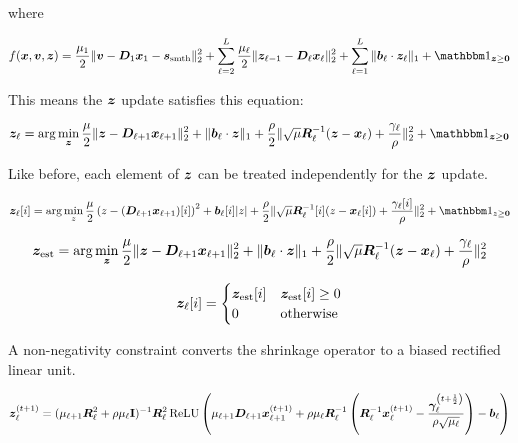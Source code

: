 where

\begin{equation}
f(\vx,\vv,\vz) = \frac{\mu_1}{2}\|\vv - \mD_1\vx_1  - \vs_{\text{smth}}\|_2^2 + \sum_{\ell = 2}^L \frac{\mu_{\ell}}{2}\|\vz_{\ell - 1} - \mD_{\ell}\vx_{\ell}\|_2^2 + \sum_{\ell = 1}^L \|\vb_{\ell} \cdot \vz_{\ell}\|_1 + \indicator_{\vz \geq \vzero}
\end{equation}

This means the $\bm{z}$ update satisfies this equation:

\begin{equation}
\vz_{\ell} = \arg\min_{\vz} \frac{\mu}{2}\|\vz - \mD_{\ell + 1}\vx_{\ell + 1}\|_2^2 + \|\vb_{\ell} \cdot \vz\|_1 + \frac{\rho}{2}\|\sqrt{\mu}\mR_{\ell}^{-1}(\vz - \vx_{\ell}) + \frac{\gamma_{\ell}}{\rho}\|_2^2 + \indicator_{\vz \geq \vzero}
\end{equation}

Like before, each element of $\bm{z}$ can be treated independently for the $\bm{z}$ update.

\begin{equation}
\vz_{\ell}[i] = \arg\min_{z} \frac{\mu}{2}\left(z - (\mD_{\ell + 1}\vx_{\ell + 1})[i]\right)^2 + \vb_{\ell}[i]|z| + \frac{\rho}{2}\|\sqrt{\mu}\mR_{\ell}^{-1}[i](z - \vx_{\ell}[i]) + \frac{\gamma_{\ell}[i]}{\rho}\|_2^2 + \indicator_{z \geq \vzero}
\end{equation}



\begin{equation}
\bm{z}_{\text{est}} = \arg\min_{\bm{z}} \frac{\mu}{2}\|\bm{z} - \bm{D}_{\ell + 1}\bm{x}_{\ell + 1}\|_2^2 + \|\bm{b}_{\ell} \cdot \bm{z}\|_1 + \frac{\rho}{2}\|\sqrt{\mu}\bm{R}_{\ell}^{-1}(\bm{z} - \bm{x}_{\ell}) + \frac{\gamma_{\ell}}{\rho}\|_2^2
\end{equation}

\begin{equation}
\bm{z}_{\ell}[i] = \begin{cases} \bm{z}_{\text{est}}[i] & \bm{z}_{\text{est}}[i] \geq 0 \\ 0 & \text{otherwise}\end{cases} 
\end{equation}

A non-negativity constraint converts the shrinkage operator to a biased rectified linear unit.

\begin{equation}
\bm{z}_{\ell}^{(t + 1)} = (\mu_{\ell + 1}\bm{R}_{\ell}^2 + \rho\mu_{\ell}{\bf I})^{-1}\bm{R}_{\ell}^2\operatorname{ReLU}\left(\mu_{\ell + 1}\bm{D}_{\ell + 1}\bm{x}_{\ell + 1}^{(t + 1)} + \rho\mu_{\ell}\bm{R}_{\ell}^{-1}\left(\bm{R}_{\ell}^{-1}\bm{x}_{\ell}^{(t + 1)} - \frac{\bm{\gamma}_{\ell}^{\left(t + \frac{1}{2}\right)}}{\rho\sqrt{\mu_{\ell}}}\right) - \bm{b}_{\ell}\right)
\end{equation}

